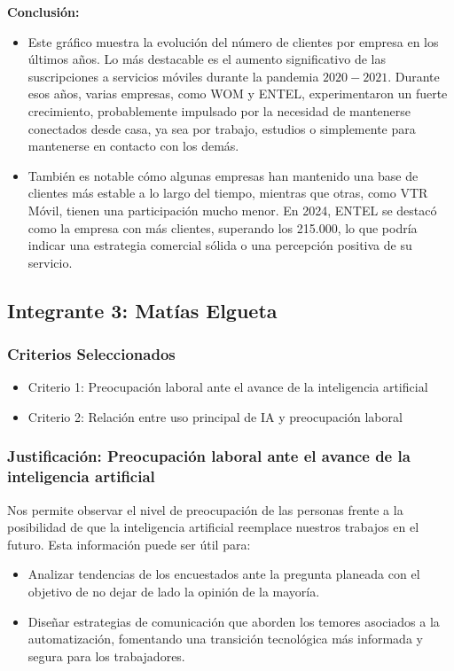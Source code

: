 \documentclass[12pt, a4paper]{article}
\begin{document}
\textbf{Conclusión:}  
\begin{itemize}
    \item Este gráfico muestra la evolución del número de clientes por empresa en los últimos años. Lo más destacable es el aumento significativo de las suscripciones a servicios móviles durante la pandemia \(2020-2021\).
    Durante esos años, varias empresas, como WOM y ENTEL, experimentaron un fuerte crecimiento, probablemente impulsado por la necesidad de mantenerse conectados desde casa, ya sea por trabajo, estudios o simplemente para mantenerse en contacto con los demás.
    \item También es notable cómo algunas empresas han mantenido una base de clientes más estable a lo largo del tiempo, mientras que otras, como VTR Móvil, tienen una participación mucho menor. En 2024, ENTEL se destacó como la empresa con más clientes, superando los 215.000, lo que podría indicar una estrategia comercial sólida o una percepción positiva de su servicio.

\end{itemize}


\subsection*{Integrante 3: Matías Elgueta}

\subsubsection*{Criterios Seleccionados}
\begin{itemize}
    \item Criterio 1: Preocupación laboral ante el avance de la inteligencia artificial
    \item Criterio 2: Relación entre uso principal de IA y preocupación laboral
\end{itemize}

\subsubsection*{Justificación: Preocupación laboral ante el avance de la inteligencia artificial}
Nos permite observar el nivel de preocupación de las personas frente a la posibilidad de que la inteligencia artificial reemplace nuestros trabajos en el futuro. Esta información puede ser útil para:

\begin{itemize}
    \item Analizar tendencias de los encuestados ante la pregunta planeada con el objetivo de no dejar de lado la opinión de la mayoría.
    \item Diseñar estrategias de comunicación que aborden los temores asociados a la automatización, fomentando una transición tecnológica más informada y segura para los trabajadores.
\end{itemize}
\end{document}
